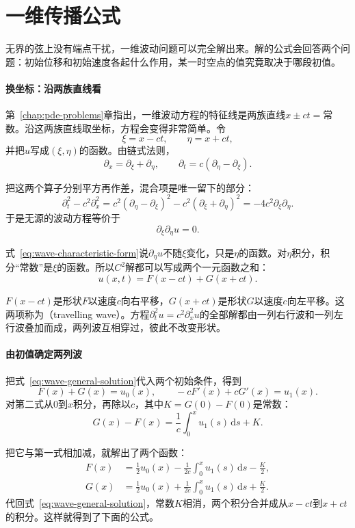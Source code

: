 \section{一维传播公式}
\label{sec:wave-dalembert}

无界的弦上没有端点干扰，一维波动问题可以完全解出来。解的公式会回答两个问题：初始位移和初始速度各起什么作用，某一时空点的值究竟取决于哪段初值。

\paragraph{换坐标：沿两族直线看}
第~\ref{chap:pde-problems}章指出，一维波动方程的特征线是两族直线$x\pm ct=$常数。沿这两族直线取坐标，方程会变得非常简单。令
\[
 \xi=x-ct,\qquad \eta=x+ct,
\]
并把$u$写成$(\xi,\eta)$的函数。由链式法则，
\[
 \partial_x=\partial_\xi+\partial_\eta,\qquad \partial_t=c(\partial_\eta-\partial_\xi).
\]

把这两个算子分别平方再作差，混合项是唯一留下的部分：
\[
 \partial_t^{2}-c^{2}\partial_x^{2}=c^{2}(\partial_\eta-\partial_\xi)^{2}-c^{2}(\partial_\xi+\partial_\eta)^{2}=-4c^{2}\partial_\xi\partial_\eta .
\]
于是无源的波动方程等价于
\begin{equation}
 \partial_\xi\partial_\eta u=0.
 \label{eq:wave-characteristic-form}
\end{equation}

式~\eqref{eq:wave-characteristic-form}说$\partial_\eta u$不随$\xi$变化，只是$\eta$的函数。对$\eta$积分，积分“常数”是$\xi$的函数。所以$C^{2}$解都可以写成两个一元函数之和：
\begin{equation}
 u(x,t)=F(x-ct)+G(x+ct).
 \label{eq:wave-general-solution}
\end{equation}

$F(x-ct)$是形状$F$以速度$c$向右平移，$G(x+ct)$是形状$G$以速度$c$向左平移。这两项称为（travelling wave）。方程$\partial_t^{2}u=c^{2}\partial_x^{2}u$的全部解都由一列右行波和一列左行波叠加而成，两列波互相穿过，彼此不改变形状。

\paragraph{由初值确定两列波}
把式~\eqref{eq:wave-general-solution}代入两个初始条件，得到
\[
 F(x)+G(x)=u_0(x),\qquad -cF'(x)+cG'(x)=u_1(x).
\]
对第二式从$0$到$x$积分，再除以$c$，其中$K=G(0)-F(0)$是常数：
\[
 G(x)-F(x)=\frac1c\int_0^{x}u_1(s)\,\mathrm{d}s+K .
\]

把它与第一式相加减，就解出了两个函数：
\[
 \begin{aligned}
  F(x)&=\frac12u_0(x)-\frac1{2c}\int_0^{x}u_1(s)\,\mathrm{d}s-\frac K2,\\
  G(x)&=\frac12u_0(x)+\frac1{2c}\int_0^{x}u_1(s)\,\mathrm{d}s+\frac K2 .
 \end{aligned}
\]
代回式~\eqref{eq:wave-general-solution}，常数$K$相消，两个积分合并成从$x-ct$到$x+ct$的积分。这样就得到了下面的公式。

